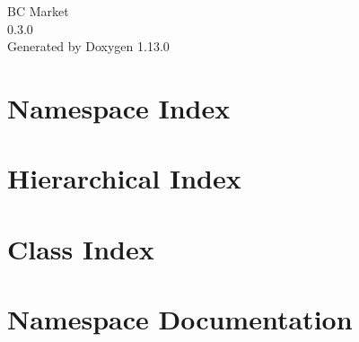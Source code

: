 \documentclass[twoside]{book}
\newcommand{\+}{\discretionary{\mbox{\scriptsize$\hookleftarrow$}}{}{}}
\newcommand{\clearemptydoublepage}{%
    \newpage{\pagestyle{empty}\cleardoublepage}%
  }
\begin{document}
  \raggedbottom
    \hypersetup{pageanchor=false,
                bookmarksnumbered=true,
                pdfencoding=unicode
               }
  \begin{titlepage}
  \vspace*{7cm}
  \begin{center}%
  {\Large BC Market}\\
  [1ex]\large 0.\+3.\+0 \\
  \vspace*{1cm}
  {\large Generated by Doxygen 1.13.0}\\
  \end{center}
  \end{titlepage}
  \clearemptydoublepage
  \tableofcontents
  \clearemptydoublepage
  \hypersetup{pageanchor=true}
\chapter{Namespace Index}

\chapter{Hierarchical Index}

\chapter{Class Index}

\chapter{Namespace Documentation}
















\end{document}
